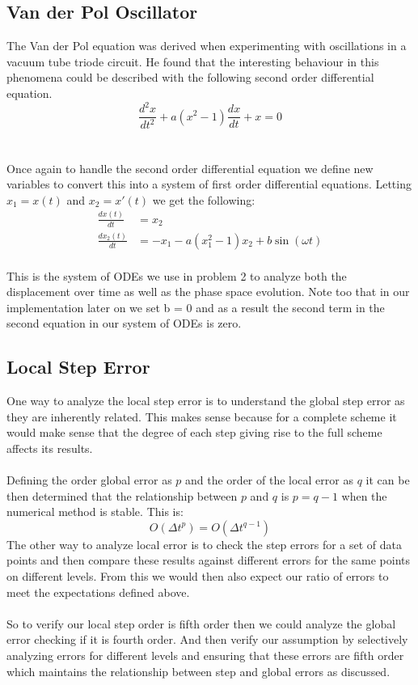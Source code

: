 \documentclass{article}
\begin{document}
\subsection{Van der Pol Oscillator}
The Van der Pol equation was derived when experimenting with oscillations in a vacuum tube triode circuit. He found that the interesting behaviour in this phenomena could be described with the following second order differential equation. $$\frac{d^2x}{dt^2} + a(x^2 - 1) \frac{dx}{dt} + x = 0$$\\
\\
Once again to handle the second order differential equation we define new variables to convert this into a system of first order differential equations. Letting $x_1 = x(t)$ and $x_2 = x'(t)$ we get the following: 
\begin{align*}
    \frac{dx(t)}{dt} &= x_2\\
    \frac{dx_2(t)}{dt} &= -x_1 - a(x_1^2 - 1) x_2 + b \sin(\omega t)
\end{align*}
\\
This is the system of ODEs we use in problem 2 to analyze both the displacement over time as well as the phase space evolution. Note too that in our implementation later on we set b = 0 and as a result the second term in the second equation in our system of ODEs is zero.

\subsection{Local Step Error}
One way to analyze the local step error is to understand the global step error as they are inherently related. This makes sense because for a complete scheme it would make sense that the degree of each step giving rise to the full scheme affects its results. \\
\\
Defining the order global error as $p$ and the order of the local error as $q$ it can be then determined that the relationship between $p$ and $q$ is $ p = q - 1$ when the numerical method is stable. This is: $$O(\Delta t^p) = O(\Delta t ^{q-1})$$
The other way to analyze local error is to check the step errors for a set of data points and then compare these results against different errors for the same points on different levels. From this we would then also expect our ratio of errors to meet the expectations defined above. \\
\\
So to verify our local step order is fifth order then we could analyze the global error checking if it is fourth order. And then verify our assumption by selectively analyzing errors for different levels and ensuring that these errors are fifth order which maintains the relationship between step and global errors as discussed.
\end{document}

